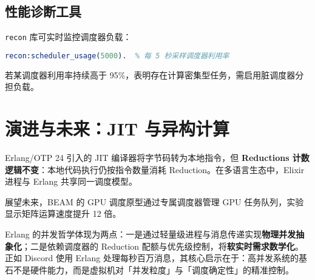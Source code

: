 \section{性能诊断工具}
\texttt{recon} 库可实时监控调度器负载：\par
\begin{lstlisting}[language=erlang]
recon:scheduler_usage(5000).  % 每 5 秒采样调度器利用率
\end{lstlisting}
若某调度器利用率持续高于 95\%{}，表明存在计算密集型任务，需启用脏调度器分担负载。\par
\chapter{演进与未来：JIT 与异构计算}
Erlang/OTP 24 引入的 JIT 编译器将字节码转为本地指令，但 \textbf{Reductions 计数逻辑不变}：本地代码执行仍按指令数量消耗 Reduction。在多语言生态中，Elixir 进程与 Erlang 共享同一调度模型。\par
展望未来，BEAM 的 GPU 调度原型通过专属调度器管理 GPU 任务队列，实验显示矩阵运算速度提升 12 倍。\par
Erlang 的并发哲学体现为两点：一是通过轻量级进程与消息传递实现\textbf{物理并发抽象化}；二是依赖调度器的 Reduction 配额与优先级控制，将\textbf{软实时需求数学化}。正如 Discord 使用 Erlang 处理每秒百万消息，其核心启示在于：高并发系统的基石不是硬件能力，而是虚拟机对「并发粒度」与「调度确定性」的精准控制。\par
